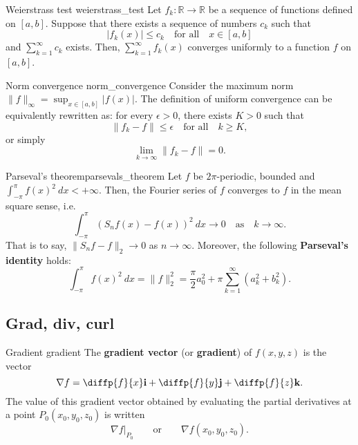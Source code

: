 \begin{theorem}{Weierstrass test \cite{math2111_notes}}{weierstrass_test}
Let $f_k : \mathbb{R} \to \mathbb{R}$ be a sequence of functions defined on $[a, b]$. Suppose that there exists a sequence of numbers $c_k$ such that
$$ |f_k(x)| \leq c_k \quad \text{for all} \quad x \in [a, b] $$
and $\sum_{k = 1}^\infty c_k$ exists. Then, $\sum_{k = 1}^\infty f_k(x)$ converges uniformly to a function $f$ on $[a, b]$.
\end{theorem}

\begin{definition}{Norm convergence \cite{math2111_notes}}{norm_convergence}
Consider the maximum norm $\lVert f \rVert_\infty = \sup_{x \in [a, b]} |f(x)|$. The definition of uniform convergence can be equivalently rewritten as: for every $\epsilon > 0$, there exists $K > 0$ such that
$$ \lVert f_k - f \rVert \leq \epsilon \quad \text{for all} \quad k \geq K , $$
or simply
$$ \lim_{k \to \infty} \lVert f_k - f \rVert = 0 . $$
\end{definition}

\begin{theorem}{Parseval's theorem}{parsevals_theorem}
Let $f$ be $2 \pi$-periodic, bounded and $\int_{-\pi}^\pi f(x)^2 \ dx < + \infty$. Then, the Fourier series of $f$ converges to $f$ in the mean square sense, i.e.
$$ \int_{- \pi}^\pi (S_n f(x) - f(x))^2 \ dx \to 0 \quad \text{as} \quad k \to \infty . $$
That is to say, $\lVert S_n f - f \rVert_2 \to 0$ as $n \to \infty$. Moreover, the following \textbf{Parseval's identity} holds:
$$ \int_{-\pi}^\pi f(x)^2 \ dx = \lVert f \rVert_2^2 = \frac{\pi}{2} a_0^2 + \pi \sum_{k = 1}^{\infty} (a_k^2 + b_k^2) . $$
\end{theorem}

\subsection{Grad, div, curl}

\begin{definition}{Gradient \cite{thomas_calculus}}{gradient}
The \textbf{gradient vector} (or \textbf{gradient}) of $f(x, y, z)$ is the vector
$$ \nabla f = \diffp{f}{x} \mathbf{i} + \diffp{f}{y} \mathbf{j} + \diffp{f}{z} \mathbf{k} . $$
The value of this gradient vector obtained by evaluating the partial derivatives at a point $P_0(x_0, y_0, z_0)$ is written
$$ \nabla f |_{P_0} \qquad \text{or} \qquad \nabla f(x_0, y_0, z_0) . $$
\end{definition}

